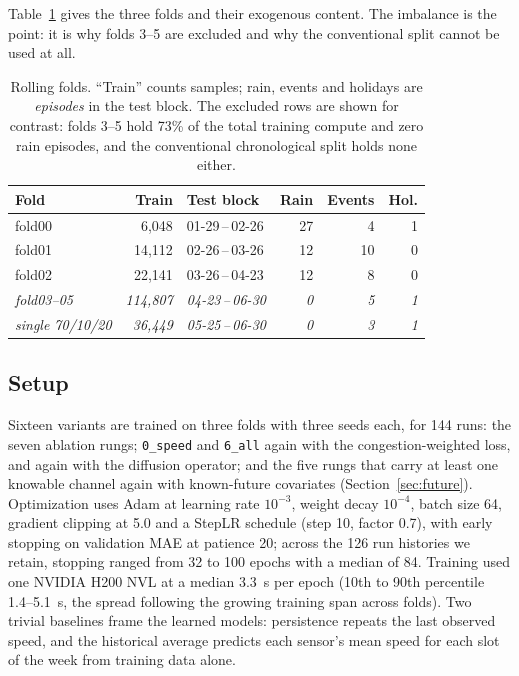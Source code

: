 \documentclass[letterpaper]{article}
\begin{document}
Table~\ref{tab:folds} gives the three folds and their exogenous content. The imbalance is the point: it is why folds 3--5 are excluded and why the conventional split cannot be used at all.

\begin{table}[t]
\centering
\small
\setlength{\tabcolsep}{4pt}
\begin{tabular}{@{}lrlrrr@{}}
\toprule
Fold & Train & Test block & Rain & Events & Hol. \\
\midrule
fold00 &  6{,}048 & 01-29\,--\,02-26 & 27 &  4 & 1 \\
fold01 & 14{,}112 & 02-26\,--\,03-26 & 12 & 10 & 0 \\
fold02 & 22{,}141 & 03-26\,--\,04-23 & 12 &  8 & 0 \\
\addlinespace
\textit{fold03--05} & \textit{114{,}807} & \textit{04-23\,--\,06-30} & \textit{0} & \textit{5} & \textit{1} \\
\textit{single 70/10/20} & \textit{36{,}449} & \textit{05-25\,--\,06-30} & \textit{0} & \textit{3} & \textit{1} \\
\bottomrule
\end{tabular}
\caption{Rolling folds. ``Train'' counts samples; rain, events and holidays are \emph{episodes} in the test block. The excluded rows are shown for contrast: folds 3--5 hold 73\% of the total training compute and zero rain episodes, and the conventional chronological split holds none either.}
\label{tab:folds}
\end{table}

\subsection{Setup}

Sixteen variants are trained on three folds with three seeds each, for 144 runs: the seven ablation rungs; \texttt{0\_speed} and \texttt{6\_all} again with the congestion-weighted loss, and again with the diffusion operator; and the five rungs that carry at least one knowable channel again with known-future covariates (Section~\ref{sec:future}). Optimization uses Adam at learning rate $10^{-3}$, weight decay $10^{-4}$, batch size 64, gradient clipping at 5.0 and a StepLR schedule (step 10, factor 0.7), with early stopping on validation MAE at patience 20; across the 126 run histories we retain, stopping ranged from 32 to 100 epochs with a median of 84. Training used one NVIDIA H200 NVL at a median 3.3~s per epoch (10th to 90th percentile 1.4--5.1~s, the spread following the growing training span across folds). Two trivial baselines frame the learned models: persistence repeats the last observed speed, and the historical average predicts each sensor's mean speed for each slot of the week from training data alone.
\end{document}
